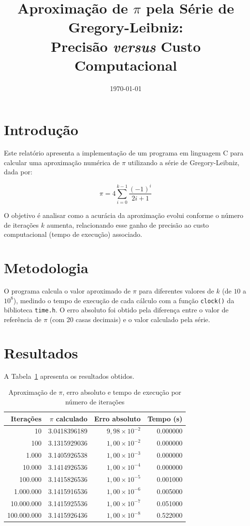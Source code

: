 \documentclass[a4paper,12pt]{article}
\title{Aproximação de $\pi$ pela Série de Gregory-Leibniz: \\ Precisão \textit{versus} Custo Computacional}
\author{}
\date{\today}
\begin{document}
\maketitle

\section{Introdução}

Este relatório apresenta a implementação de um programa em linguagem C para calcular
uma aproximação numérica de $\pi$ utilizando a série de Gregory-Leibniz, dada por:

\begin{equation}
    \pi = 4 \sum_{i=0}^{k-1} \frac{(-1)^i}{2i+1}
\end{equation}

O objetivo é analisar como a acurácia da aproximação evolui conforme o número de
iterações $k$ aumenta, relacionando esse ganho de precisão ao custo computacional
(tempo de execução) associado.

\section{Metodologia}

O programa calcula o valor aproximado de $\pi$ para diferentes valores de $k$
(de $10$ a $10^8$), medindo o tempo de execução de cada cálculo com a função
\texttt{clock()} da biblioteca \texttt{time.h}. O erro absoluto foi obtido pela
diferença entre o valor de referência de $\pi$ (com 20 casas decimais) e o valor
calculado pela série.

\section{Resultados}

A Tabela~\ref{tab:resultados} apresenta os resultados obtidos.

\begin{table}[h]
\centering
\caption{Aproximação de $\pi$, erro absoluto e tempo de execução por número de iterações}
\label{tab:resultados}
\begin{tabular}{rrrr}
\toprule
Iterações & $\pi$ calculado & Erro absoluto & Tempo (s) \\
\midrule
10          & 3.0418396189 & $9{,}98 \times 10^{-2}$ & 0.000000 \\
100         & 3.1315929036 & $1{,}00 \times 10^{-2}$ & 0.000000 \\
1.000       & 3.1405926538 & $1{,}00 \times 10^{-3}$ & 0.000000 \\
10.000      & 3.1414926536 & $1{,}00 \times 10^{-4}$ & 0.000000 \\
100.000     & 3.1415826536 & $1{,}00 \times 10^{-5}$ & 0.001000 \\
1.000.000   & 3.1415916536 & $1{,}00 \times 10^{-6}$ & 0.005000 \\
10.000.000  & 3.1415925536 & $1{,}00 \times 10^{-7}$ & 0.051000 \\
100.000.000 & 3.1415926436 & $1{,}00 \times 10^{-8}$ & 0.522000 \\
\bottomrule
\end{tabular}
\end{table}
\end{document}
